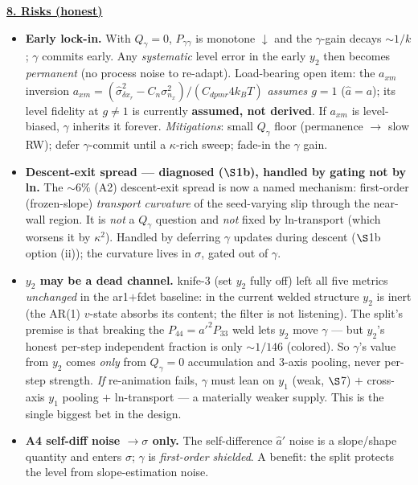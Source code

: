 \documentclass[11pt,a4paper,fontset=none]{ctexart}
\newcommand{\hd}[1]{\par\medskip\noindent\underline{\textbf{#1}}\par\nobreak\vspace{0.2ex}}
\begin{document}
\hd{8. Risks (honest)}
\begin{itemize}[leftmargin=1.4em,topsep=2pt,itemsep=4pt]
\item \textbf{Early lock-in.} With $Q_\gamma=0$, $P_{\gamma\gamma}$ is monotone $\downarrow$ and the $\gamma$-gain decays $\sim\!1/k$; $\gamma$ commits early. Any \emph{systematic} level error in the early $y_2$ then becomes \emph{permanent} (no process noise to re-adapt). Load-bearing open item: the $a_{xm}$ inversion $a_{xm}=(\hat\sigma^2_{\delta x_r}-C_n\sigma^2_{n_x})/(C_{dpmr}4k_BT)$ \emph{assumes $g=1$} ($\hat a=a$); its level fidelity at $g\ne1$ is currently \textbf{assumed, not derived}. If $a_{xm}$ is level-biased, $\gamma$ inherits it forever. \emph{Mitigations}: small $Q_\gamma$ floor (permanence $\to$ slow RW); defer $\gamma$-commit until a $\kappa$-rich sweep; fade-in the $\gamma$ gain.
\item \textbf{Descent-exit spread --- diagnosed ($\S$1b), handled by gating not by ln.} The $\sim\!6\%$ (A2) descent-exit spread is now a named mechanism: first-order (frozen-slope) \emph{transport curvature} of the seed-varying slip through the near-wall region. It is \emph{not} a $Q_\gamma$ question and \emph{not} fixed by ln-transport (which worsens it by $\kappa^2$). Handled by deferring $\gamma$ updates during descent ($\S$1b option (ii)); the curvature lives in $\sigma$, gated out of $\gamma$.
\item \textbf{$y_2$ may be a dead channel.} knife-3 (set $y_2$ fully off) left all five metrics \emph{unchanged} in the ar1$+$fdet baseline: in the current welded structure $y_2$ is inert (the AR(1) $v$-state absorbs its content; the filter is not listening). The split's premise is that breaking the $P_{44}=a'^2P_{33}$ weld lets $y_2$ move $\gamma$ --- but $y_2$'s honest per-step independent fraction is only $\sim\!1/146$ (colored). So $\gamma$'s value from $y_2$ comes \emph{only} from $Q_\gamma=0$ accumulation and 3-axis pooling, never per-step strength. \emph{If} re-animation fails, $\gamma$ must lean on $y_1$ (weak, $\S$7) $+$ cross-axis $y_1$ pooling $+$ ln-transport --- a materially weaker supply. This is the single biggest bet in the design.
\item \textbf{A4 self-diff noise $\to\sigma$ only.} The self-difference $\hat a'$ noise is a slope/shape quantity and enters $\sigma$; $\gamma$ is \emph{first-order shielded}. A benefit: the split protects the level from slope-estimation noise.
\end{itemize}
\end{document}

